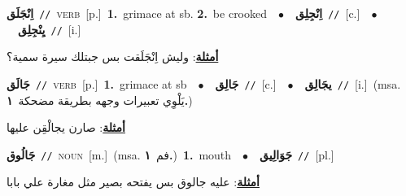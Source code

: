 \documentclass[10pt,a4paper,twoside]{article} %
\begin{document}
\begin{multicols}{2}
{\setlength\topsep{0pt}\textbf{\foreignlanguage{arabic}{اِنْجَلَق}}\ {\color{gray}\texttt{//}\color{black}}\ \textsc{verb}\ [p.]\ \textbf{1.}~grimace at sb.  \textbf{2.}~be crooked\ \ $\bullet$\ \ \setlength\topsep{0pt}\textbf{\foreignlanguage{arabic}{اِنْجِلِق}}\ {\color{gray}\texttt{//}\color{black}}\ [c.]\ \ $\bullet$\ \ \setlength\topsep{0pt}\textbf{\foreignlanguage{arabic}{يِنْجِلِق}}\ {\color{gray}\texttt{//}\color{black}}\ [i.]\  \begin{flushright}\color{gray}\foreignlanguage{arabic}{\textbf{\underline{\foreignlanguage{arabic}{أمثلة}}}: وليش اِنْجَلَقت بس جبتلك سيرة سمية؟}\end{flushright}\color{black}} \vspace{2mm}

{\setlength\topsep{0pt}\textbf{\foreignlanguage{arabic}{جَالَق}}\ {\color{gray}\texttt{//}\color{black}}\ \textsc{verb}\ [p.]\ \textbf{1.}~grimace at sb\ \ $\bullet$\ \ \setlength\topsep{0pt}\textbf{\foreignlanguage{arabic}{جَالِق}}\ {\color{gray}\texttt{//}\color{black}}\ [c.]\ \ $\bullet$\ \ \setlength\topsep{0pt}\textbf{\foreignlanguage{arabic}{يجَالِق}}\ {\color{gray}\texttt{//}\color{black}}\ [i.]\ \color{gray}(msa. \foreignlanguage{arabic}{يَلْوِي تعبيرات وجهه بطريقة مضحكة}~\foreignlanguage{arabic}{\textbf{١.}})\color{black}\  \begin{flushright}\color{gray}\foreignlanguage{arabic}{\textbf{\underline{\foreignlanguage{arabic}{أمثلة}}}: صارن يجالْقِن عليها}\end{flushright}\color{black}} \vspace{2mm}

{\setlength\topsep{0pt}\textbf{\foreignlanguage{arabic}{جَالُوق}}\ {\color{gray}\texttt{//}\color{black}}\ \textsc{noun}\ [m.]\ \color{gray}(msa. \foreignlanguage{arabic}{فم}~\foreignlanguage{arabic}{\textbf{١.}})\color{black}\ \textbf{1.}~mouth\ \ $\bullet$\ \ \setlength\topsep{0pt}\textbf{\foreignlanguage{arabic}{جَوَالِيق}}\ {\color{gray}\texttt{//}\color{black}}\ [pl.]\  \begin{flushright}\color{gray}\foreignlanguage{arabic}{\textbf{\underline{\foreignlanguage{arabic}{أمثلة}}}: عليه جالوق بس يفتحه بصير مثل مغارة علي بابا}\end{flushright}\color{black}} \vspace{2mm}


\end{multicols}
\end{document}
